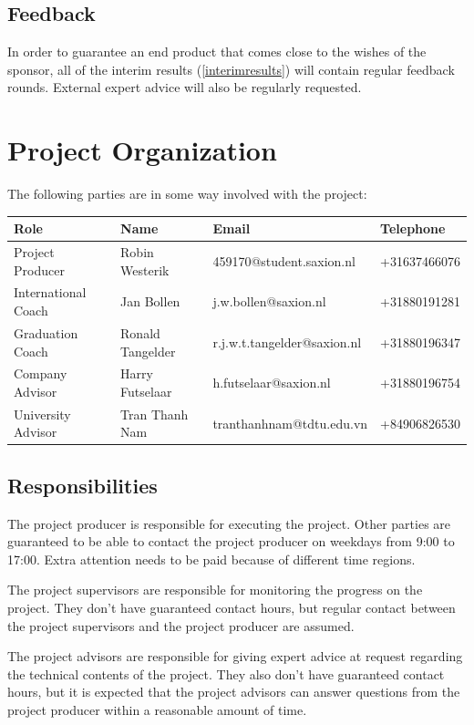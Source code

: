 \documentclass[11pt, a4paper]{article}
\begin{document}
\subsection{Feedback}
In order to guarantee an end product that comes close to the wishes of the sponsor, all of the interim results (\ref{interimresults}) will contain regular feedback rounds. External expert advice will also be regularly requested.
\pagebreak
\section{Project Organization}\label{projectorganization}
The following parties are in some way involved with the project:\\

\begin{tabular}{ | l | l | l | l |}
    \hline
    \textbf{Role} & \textbf{Name} & \textbf{Email} & \textbf{Telephone} \\ \hline
    Project Producer & Robin Westerik & 459170@student.saxion.nl & +31637466076 \\
    International Coach & Jan Bollen & j.w.bollen@saxion.nl & +31880191281\\
    Graduation Coach & Ronald Tangelder & r.j.w.t.tangelder@saxion.nl & +31880196347\\
    Company Advisor & Harry Futselaar & h.futselaar@saxion.nl & +31880196754\\
    University Advisor & Tran Thanh Nam & tranthanhnam@tdtu.edu.vn & +84906826530\\
    \hline
\end{tabular}

\subsection{Responsibilities}
The project producer is responsible for executing the project. Other parties are guaranteed to be able to contact the project producer on weekdays from 9:00 to 17:00. Extra attention needs to be paid because of different time regions.

The project supervisors are responsible for monitoring the progress on the project. They don't have guaranteed contact hours, but regular contact between the project supervisors and the project producer are assumed.

The project advisors are responsible for giving expert advice at request regarding the technical contents of the project. They also don't have guaranteed contact hours, but it is expected that the project advisors can answer questions from the project producer within a reasonable amount of time.
\end{document}
